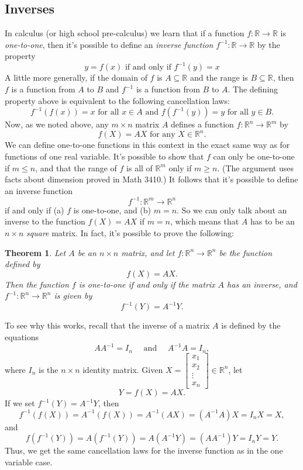 \documentclass[letterpaper,12pt]{article}
\newtheorem{theorem}{Theorem}
\newcommand{\R}{\mathbb{R}}
\begin{document}
\subsection*{Inverses}
In calculus (or high school pre-calculus) we learn that if a function $f:\R\to\R$ is {\em one-to-one}, then it's possible to define an {\em inverse function} $f^{-1}:\R\to\R$ by the property
\[
 y = f(x) \text{ if and only if } f^{-1}(y) = x
\]
A little more generally, if the domain of $f$ is $A\subseteq \R$ and the range is $B\subseteq \R$, then $f$ is a function from $A$ to $B$ and $f^{-1}$ is a function from $B$ to $A$. The defining property above is equivalent to the following cancellation laws:
\[
 f^{-1}(f(x))=x \text{ for all } x\in A \text{ and } f(f^{-1}(y)) = y \text{ for all } y\in B.
\]
Now, as we noted above, any $m\times n$ matrix $A$ defines a function $f:\R^n\to \R^m$ by
\[
 f(X) = AX \text{ for any } X\in\R^n.
\]
We can define one-to-one functions in this context in the exact same way as for functions of one real variable. It's possible to show that $f$ can only be one-to-one if $m\leq n$, and that the range of $f$ is all of $\R^m$ only if $m\geq n$. (The argument uses facts about dimension proved in Math 3410.) It follows that it's possible to define an inverse function
\[
 f^{-1}:\R^m\to\R^n
\]
if and only if (a) $f$ is one-to-one, and (b) $m=n$. So we can only talk about an inverse to the function $f(X)=AX$ if $m=n$, which means that $A$ has to be an $n\times n$ {\em square} matrix. In fact, it's possible to prove the following:
\begin{theorem}
 Let $A$ be an $n\times n$ matrix, and let $f:\R^n\to\R^n$ be the function defined by
\[
 f(X) = AX.
\]
Then the function $f$ is one-to-one if and only if the matrix $A$ has an inverse, and $f^{-1}:\R^n\to\R^n$ is given by
\[
 f^{-1}(Y)=A^{-1}Y.
\]
\end{theorem}
To see why this works, recall that the inverse of a matrix $A$ is defined by the equations
\[
 AA^{-1}=I_n \quad \text{ and } \quad A^{-1}A=I_n,
\]
where $I_n$ is the $n\times n$ identity matrix. Given $X = \begin{bmatrix}x_1\\x_2\\\vdots \\x_n\end{bmatrix}\in\R^n$, let
\[
 Y = f(X) = AX.
\]
If we set $f^{-1}(Y) = A^{-1}Y$, then
\[
 f^{-1}(f(X)) = A^{-1}(f(X)) = A^{-1}(AX) = (A^{-1}A)X = I_nX = X,
\]
and
\[
 f(f^{-1}(Y)) = A(f^{-1}(Y)) = A(A^{-1}Y) = (AA^{-1})Y=I_nY = Y.
\]
Thus, we get the same cancellation laws for the inverse function as in the one variable case. 
\end{document}
